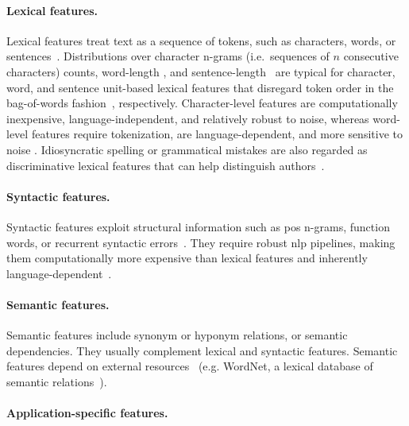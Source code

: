 \paragraph{Lexical features.} 
Lexical features treat text as a sequence of tokens, such as characters, words, or sentences~\citep{stamatatos_survey_2009}.
Distributions over character n-grams (i.e.\ sequences of $n$ consecutive characters) counts, word-length \citep{stein_intrinsic_2011}, and sentence-length~\citep{stein_intrinsic_2011,abbasi_writeprints_2008} are typical for character, word, and sentence unit-based lexical features that disregard token order in the bag-of-words fashion~\citep{neal_surveying_2018}, respectively. %
Character-level features are computationally inexpensive, language-independent, and relatively robust to noise, whereas word-level features require tokenization, are language-dependent, and more sensitive to noise \citep{stamatatos_survey_2009}.
Idiosyncratic spelling or grammatical mistakes are also regarded as discriminative lexical features that can help distinguish authors~\citep{abbasi_writeprints_2008,neal_surveying_2018}. 

\paragraph{Syntactic features.}
Syntactic features exploit structural information such as \ac{pos} n-grams, function words, or recurrent syntactic errors~\citep{stamatatos_survey_2009,abbasi_writeprints_2008}.
They require robust \ac{nlp} pipelines, making them computationally more expensive than lexical features and inherently language-dependent~\citep{neal_surveying_2018,stamatatos_survey_2009}.

\paragraph{Semantic features.}
Semantic features include synonym or hyponym relations, or semantic dependencies. 
They usually complement lexical and syntactic features. 
Semantic features depend on external resources~\citep{stamatatos_survey_2009} (e.g. WordNet, a lexical database of semantic relations~\citep{wordnet_1995}).


\paragraph{Application-specific features.} %

